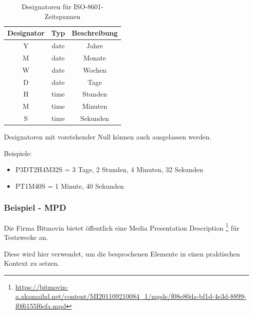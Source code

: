 \documentclass[paper = a4, fontsize = 12pt, parskip = half]{scrartcl} %
\begin{document}
\begin{center}
    \begin{table}[ht]
        \label{iso_duration_designators}
        \centering
        \begin{tabular}{|c|c|c|}
            \hline
                \textbf{Designator} & \textbf{Typ} & \textbf{Beschreibung} \\
            \hline
            \hline
            Y & date & Jahre \\
            \hline
            M & date & Monate \\
            \hline
            W & date & Wochen \\
            \hline
            D & date & Tage \\
            \hline
            \hline
            H & time & Stunden \\
            \hline
            M & time & Minuten \\
            \hline
            S & time & Sekunden \\
            \hline
        \end{tabular}
        \caption{Designatoren für ISO-8601-Zeitspannen}
    \end{table}
\end{center}
Designatoren mit vorstehender Null können auch ausgelassen werden. 

Beispiele:

\begin{itemize}
	\item P3DT2H4M32S = 3 Tage, 2 Stunden, 4 Minuten, 32 Sekunden
	\item PT1M40S = 1 Minute, 40 Sekunden
\end{itemize}

\subsubsection{Beispiel - MPD}
\label{mpd_example}
 Die Firma Bitmovin bietet öffentlich eine Media Presentation Description \footnote{\url{https://bitmovin-a.akamaihd.net/content/MI201109210084_1/mpds/f08e80da-bf1d-4e3d-8899-f0f6155f6efa.mpd}} für Testzwecke an. 
 
 Diese wird hier verwendet, um die besprochenen Elemente in einen praktischen Kontext zu setzen.
\end{document}
